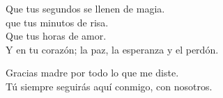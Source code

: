 \begin{flushright}
    Que tus segundos se llenen de magia.\\
    que tus minutos de risa.\\
    Que tus horas de amor.\\
    Y en tu corazón; la paz, la esperanza y el perdón. 

    Gracias madre por todo lo que me diste. \\ 
    Tú siempre seguirás aquí conmigo, con nosotros. 
    	
\end{flushright}